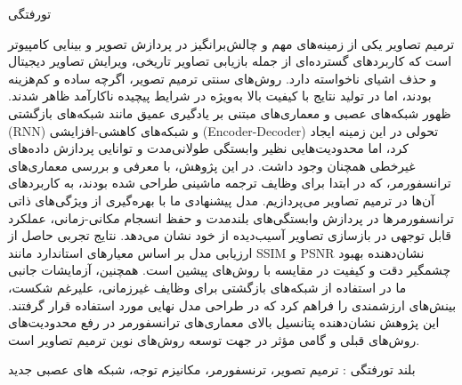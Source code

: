 


‌تورفتگی

ترمیم تصاویر یکی از زمینه‌های مهم و چالش‌برانگیز در پردازش تصویر و بینایی کامپیوتر است که کاربردهای گسترده‌ای از جمله بازیابی تصاویر تاریخی، ویرایش تصاویر دیجیتال و حذف اشیای ناخواسته دارد. روش‌های سنتی ترمیم تصویر، اگرچه ساده و کم‌هزینه بودند، اما در تولید نتایج با کیفیت بالا به‌ویژه در شرایط پیچیده ناکارآمد ظاهر شدند. ظهور شبکه‌های عصبی و معماری‌های مبتنی بر یادگیری عمیق مانند شبکه‌های بازگشتی (RNN) و شبکه‌های کاهشی-افزایشی (Encoder-Decoder) تحولی در این زمینه ایجاد کرد، اما محدودیت‌هایی نظیر وابستگی طولانی‌مدت و توانایی پردازش داده‌های غیرخطی همچنان وجود داشت.
در این پژوهش، با معرفی و بررسی معماری‌های ترانسفورمر، که در ابتدا برای وظایف ترجمه ماشینی طراحی شده بودند، به کاربردهای آن‌ها در ترمیم تصاویر می‌پردازیم. مدل پیشنهادی ما با بهره‌گیری از ویژگی‌های ذاتی ترانسفورمرها در پردازش وابستگی‌های بلندمدت و حفظ انسجام مکانی-زمانی، عملکرد قابل توجهی در بازسازی تصاویر آسیب‌دیده از خود نشان می‌دهد.
نتایج تجربی حاصل از ارزیابی مدل بر اساس معیارهای استاندارد مانند SSIM و PSNR نشان‌دهنده بهبود چشمگیر دقت و کیفیت در مقایسه با روش‌های پیشین است. همچنین، آزمایشات جانبی ما در استفاده از شبکه‌های بازگشتی برای وظایف غیرزمانی، علیرغم شکست، بینش‌های ارزشمندی را فراهم کرد که در طراحی مدل نهایی مورد استفاده قرار گرفتند.
این پژوهش نشان‌دهنده پتانسیل بالای معماری‌های ترانسفورمر در رفع محدودیت‌های روش‌های قبلی و گامی مؤثر در جهت توسعه روش‌های نوین ترمیم تصاویر است.

‌بلند
‌تورفتگی :
ترمیم تصویر، ترنسفورمر، مکانیزم توجه، شبکه های عصبی
‌جدید
